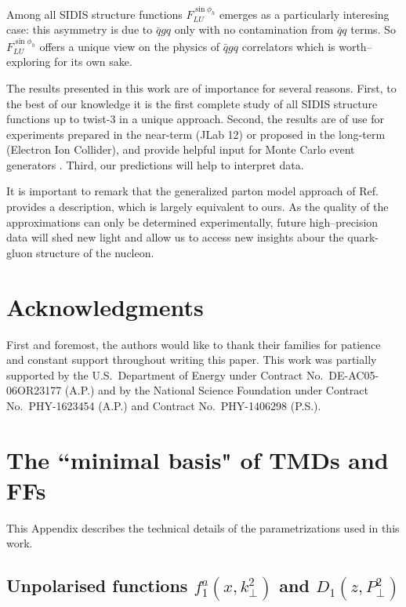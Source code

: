 \documentclass[a4paper,11pt]{article}
\begin{document}
Among all SIDIS structure functions $F_{LU}^{\sin\phi_h}$ emerges as
a particularly interesing case: this asymmetry is due to $\bar qgq$
only with no contamination from $\bar qq$ terms.
So $F_{LU}^{\sin\phi_h}$ offers a unique view on the physics of $\bar qgq$ 
correlators which is worth--exploring for its own sake.

The results presented in this work are of importance for several reasons.
First, to the best of our knowledge it is the first complete study 
of all SIDIS structure functions up to twist-3 in a unique approach. 
Second, the results are of use for experiments prepared in the near-term 
(JLab 12) or proposed in the long-term (Electron Ion Collider),
and provide helpful input for Monte Carlo event generators 
\cite{Avakian:2015vha}.
Third, our predictions will help to interpret data.

It is important to remark that the generalized parton model 
approach of Ref.~\cite{Anselmino:2011ch} provides a description,
which is largely equivalent to ours. As the quality of the 
approximations can only be determined experimentally, future
high--precision data will shed new light and allow us to 
access new insights abour the quark-gluon structure
of the nucleon.


\section{Acknowledgments}
First and foremost, the authors would like to thank their families for patience and
constant support throughout writing this paper. This work was 
partially supported by the U.S.\ Department of Energy under 
Contract No.~DE-AC05-06OR23177 (A.P.) and by the National 
Science Foundation under Contract No.\ PHY-1623454 (A.P.)
and Contract No.\ PHY-1406298 (P.S.).


 
\newpage
\appendix

\section{\boldmath The ``minimal basis" of TMDs and FFs}
\label{App:basis}

This Appendix describes the technical details of the parametrizations
used in this work.

\subsection{\boldmath Unpolarised functions $f_1^a(x,k_\perp^2)$ 
			and $D_1(z,P_\perp^2)$}
\label{App:basis-f1-D1}
\end{document}
